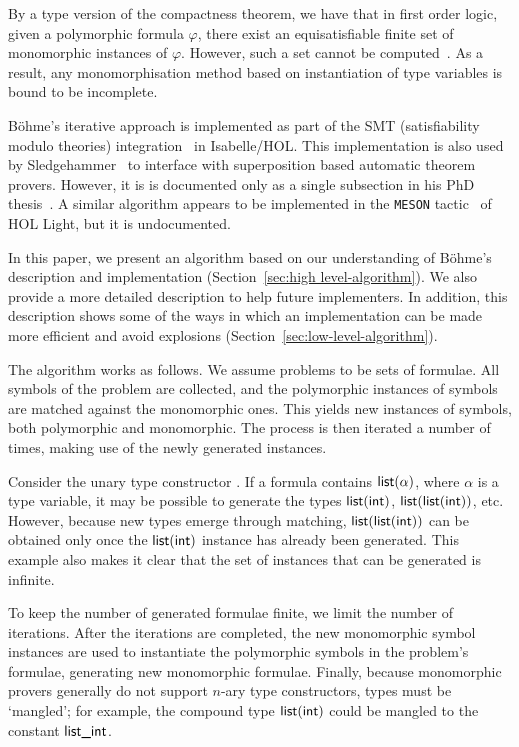 \documentclass[runningheads]{llncs}
\begin{document}
By a type version of the compactness theorem, we have that in first order logic, given a polymorphic formula \(\varphi\), there exist an equisatisfiable finite set of monomorphic instances of \(\varphi\). However, such a set cannot be computed~\cite[Theorem 1]{expr-poly-types}. As a result, any monomorphisation method based on instantiation of type variables is
bound to be incomplete.

B\"ohme's iterative approach is implemented as part of the SMT (satisfiability modulo theories) integration~\cite[Chapter 2]{sb-phd} in Isabelle/HOL. This implementation is also used by Sledgehammer~\cite{judgement,hammer} to interface with superposition based automatic theorem provers. However, it is is documented only as a single subsection in his PhD thesis~\cite[Section 2.2.1]{sb-phd}.
A similar algorithm appears to be implemented in the \texttt{MESON} tactic~\cite{harrison-1996} of HOL Light, but it is undocumented.

In this paper, we present an algorithm based on our understanding of Böhme's description and implementation (Section~\ref{sec:high level-algorithm}). We also provide a more detailed description to help future implementers. In addition, this description shows some of the ways in which an implementation can be made more efficient and avoid explosions (Section~\ref{sec:low-level-algorithm}).

The algorithm works as follows. We assume problems to be sets of formulae. All symbols of the problem are collected, and the polymorphic instances of symbols are matched against the monomorphic ones. This yields new instances of symbols, both polymorphic and monomorphic. The process is then iterated
a number of times, making use of the newly generated instances.

Consider the unary type constructor . If a formula contains $\textsf{list}(\alpha)$, where $\alpha$ is a type variable, it may be possible to generate the types $\textsf{list}(\textsf{int})$, $\textsf{list}(\textsf{list}(\textsf{int}))$, etc. However, because new types emerge through matching, $\textsf{list}(\textsf{list}(\textsf{int}))$ can be obtained only once the $\textsf{list}(\textsf{int})$ instance has already been generated. This example also makes it clear that the set of instances that can be generated is infinite.

To keep the number of generated formulae finite, we limit the number of iterations. After the iterations are completed, the new monomorphic symbol instances are used to instantiate the polymorphic symbols in the problem's formulae, generating new monomorphic formulae. Finally, because monomorphic provers generally do not support $n$-ary type constructors, types must be `mangled'; for example, the compound type $\textsf{list}(\textsf{int})$ could be mangled to the constant $\textsf{list\_int}$.
\end{document}
